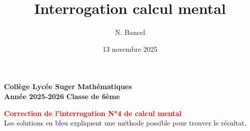 \documentclass[answers]{exam}
\title{Interrogation calcul mental}
\author{N. Bancel}
\date{13 novembre 2025}
\begin{document}
\textbf{Collège Lycée Suger}
\hfill
\textbf{Mathématiques} \\

\textbf{Année 2025-2026}
\hfill
\textbf{Classe de 6ème} \par

{\let\newpage\relax\maketitle}

\begin{center}
  \textbf{\textcolor{red}{Correction de l'interrogation N°4 de calcul mental}} \\
  Les solutions en \textcolor{blue}{bleu} expliquent une méthode possible pour trouver le résultat.
\end{center}
\end{document}

